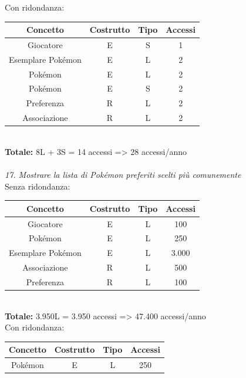 \documentclass[a4paper,12pt]{report}
\begin{document}
Con ridondanza: \\

\begin{tabular}{|c|c|c|c|}
  \hline
  \rowcolor{gray!30}Concetto & Costrutto & Tipo & Accessi \\
  \hline
  Giocatore & E & S & 1 \\
  \hline
  Esemplare Pokémon & E & L & 2 \\
  \hline
  Pokémon & E & L & 2 \\
  \hline
  Pokémon & E & S & 2 \\
  \hline
  Preferenza & R & L & 2 \\
  \hline
  Associazione & R & L & 2 \\
  \hline
\end{tabular} \\
  
\textbf{Totale:} 8L + 3S = 14 accessi => 28 accessi/anno \\
\\
\textit{17. Mostrare la lista di Pokémon preferiti scelti più comunemente} \\

Senza ridondanza: \\

\begin{tabular}{|c|c|c|c|}
  \hline
  \rowcolor{gray!30}Concetto & Costrutto & Tipo & Accessi \\
  \hline
  Giocatore & E & L & 100 \\
  \hline
  Pokémon & E & L & 250 \\
  \hline
  Esemplare Pokémon & E & L & 3.000 \\
  \hline
  Associazione & R & L & 500 \\
  \hline
  Preferenza & R & L & 100 \\
  \hline
\end{tabular} \\
  
\textbf{Totale:} 3.950L = 3.950 accessi => 47.400 accessi/anno \\

Con ridondanza: \\

\begin{tabular}{|c|c|c|c|}
  \hline
  \rowcolor{gray!30}Concetto & Costrutto & Tipo & Accessi \\
  \hline
  Pokémon & E & L & 250 \\
  \hline
\end{tabular} \\
  
\end{document}
